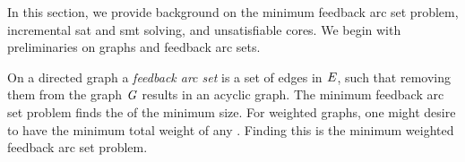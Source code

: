 \label{section:background}

In this section, we provide background on the minimum feedback arc set problem,
incremental \ac{sat} and \ac{smt} solving, and unsatisfiable cores. We begin
with preliminaries on graphs and feedback arc sets.

On a directed graph  a \emph{feedback arc set}  is a set
of edges in $\mathit{E}$, such that removing them from the graph $\mathit{G}$ results in
an acyclic graph. The minimum feedback arc set problem finds the
 of the minimum size. For weighted graphs, one might desire
 to have the minimum total weight of any . Finding this
 is the minimum weighted feedback arc set problem.




